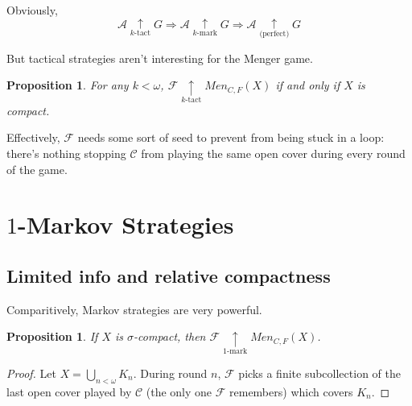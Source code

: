 \documentclass{beamer}
\newtheorem{proposition}[theorem]{Proposition}
\theoremstyle{definition}
\newcommand{\kmarkwin}[1]{\underset{#1\text{-mark}}{\uparrow}}
\newcommand{\ktactwin}[1]{\underset{#1\text{-tact}}{\uparrow}}
\newcommand{\mengame}[1]{Men_{C,F}(#1)}
\newcommand{\<}{\langle}
\renewcommand{\>}{\rangle}
\newcommand{\pl}[1]{\mathscr{#1}}
\begin{document}
\begin{frame}
  Obviously,
  \[
    \pl A \ktactwin{k} G
      \Rightarrow
    \pl A \kmarkwin{k} G
      \Rightarrow
    \pl A \underset{\text{(perfect)}}{\uparrow} G
  \]

  \vpause

  But tactical strategies aren't interesting for the Menger game.

  \begin{proposition}
    For any $k<\omega$,
    $\pl F\ktactwin{k}\mengame X$ if and only if $X$ is compact.
  \end{proposition}

  Effectively, $\pl F$ needs some sort of seed to prevent from being
  stuck in a loop: there's nothing stopping $\pl C$ from playing the
  same open cover during every round of the game.
\end{frame}

\section{$1$-Markov Strategies}

\subsection{Limited info and relative compactness}

\begin{frame}
  Comparitively, Markov strategies are very powerful.

  \begin{proposition}
    If $X$ is $\sigma$-compact, then $\pl F \kmarkwin{1}\mengame X$.
  \end{proposition}

  \begin{proof}
    Let $X=\bigcup_{n<\omega}K_n$. During round $n$, $\pl F$ picks a finite
    subcollection of
    the last open cover played by $\pl C$ (the only one $\pl F$ remembers)
    which covers $K_n$.
  \end{proof}
\end{frame}
\end{document}
